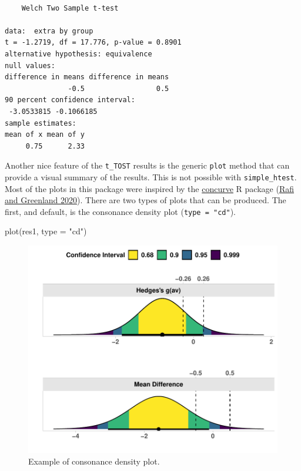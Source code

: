 \documentclass[
]{interact}
\newenvironment{Shaded}{\begin{snugshade}}{\end{snugshade}}
\newcommand{\AttributeTok}[1]{\textcolor[rgb]{0.40,0.45,0.13}{#1}}
\newcommand{\FunctionTok}[1]{\textcolor[rgb]{0.28,0.35,0.67}{#1}}
\newcommand{\NormalTok}[1]{\textcolor[rgb]{0.00,0.23,0.31}{#1}}
\newcommand{\StringTok}[1]{\textcolor[rgb]{0.13,0.47,0.30}{#1}}
\begin{document}
\begin{verbatim}

    Welch Two Sample t-test

data:  extra by group
t = -1.2719, df = 17.776, p-value = 0.8901
alternative hypothesis: equivalence
null values:
difference in means difference in means 
               -0.5                 0.5 
90 percent confidence interval:
 -3.0533815 -0.1066185
sample estimates:
mean of x mean of y 
     0.75      2.33 
\end{verbatim}

\newpage

Another nice feature of the \texttt{t\_TOST} results is the generic
\texttt{plot} method that can provide a visual summary of the results.
This is not possible with \texttt{simple\_htest}. Most of the plots in
this package were inspired by the
\href{https://cran.r-project.org/package=concurve}{concurve} R package
(\protect\hyperlink{ref-rafi2020}{Rafi and Greenland 2020}). There are
two types of plots that can be produced. The first, and default, is the
consonance density plot (\texttt{type\ =\ "cd"}).

\begin{Shaded}
\begin{Highlighting}[]
\FunctionTok{plot}\NormalTok{(res1, }\AttributeTok{type =} \StringTok{"cd"}\NormalTok{)}
\end{Highlighting}
\end{Shaded}

\begin{figure}[H]

{\centering \includegraphics{avocado-quarto_files/figure-pdf/cdplot-1.pdf}

}

\caption{Example of consonance density plot.}

\end{figure}
\end{document}

